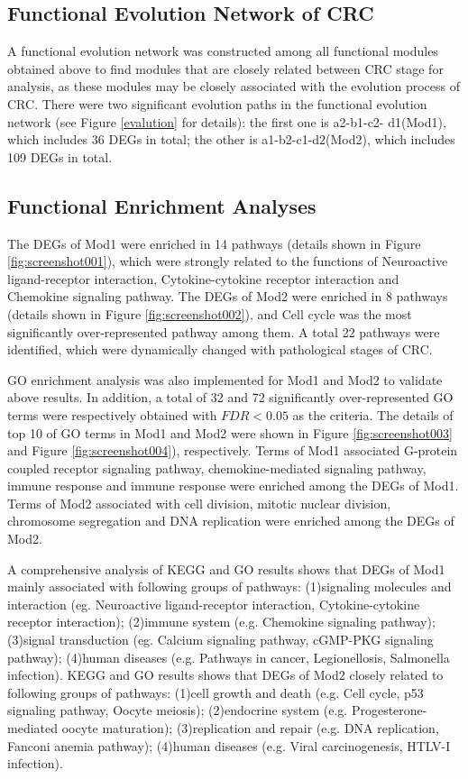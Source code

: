 \documentclass[utf8]{frontiersSCNS} %
\begin{document}
\subsection{Functional Evolution Network of CRC}

A functional evolution network was constructed among all functional modules obtained above to find modules that are closely related between CRC stage for analysis, as these modules may be closely associated with the evolution process of CRC. There were two significant evolution paths in the functional evolution
network (see Figure \ref{evalution} for details): the first one is a2-b1-c2-
d1(Mod1), which includes 36 DEGs in total; the other is
a1-b2-c1-d2(Mod2), which includes 109 DEGs in total. 

\subsection{Functional Enrichment Analyses}
The DEGs of Mod1 were enriched in 14 pathways
(details shown in Figure \ref{fig:screenshot001}), which were strongly related to
the functions of Neuroactive ligand-receptor interaction, Cytokine-cytokine receptor interaction and 
Chemokine signaling pathway. The DEGs of Mod2
were enriched in 8 pathways (details shown in Figure \ref{fig:screenshot002}), and Cell cycle was the most significantly over-represented pathway among them. A total 22
pathways were identified, which were dynamically changed
with pathological stages of CRC.

GO enrichment analysis was also implemented for Mod1 and Mod2 to validate above results. In addition, a total of 32 and 72 significantly over-represented GO terms were respectively obtained with $FDR < 0.05$ as the criteria. The details of top 10 of GO terms in Mod1 and Mod2 were shown in Figure \ref{fig:screenshot003} and Figure \ref{fig:screenshot004}), respectively. Terms of Mod1 associated 
G-protein coupled receptor signaling pathway, chemokine-mediated signaling pathway, immune response and immune response were enriched among the DEGs of Mod1. Terms of Mod2 associated with cell division, mitotic nuclear division, chromosome segregation and DNA replication were enriched among the DEGs of Mod2.


A comprehensive analysis of KEGG and GO results shows that DEGs of Mod1 mainly associated with following groups of pathways: (1)signaling molecules and interaction (eg. Neuroactive ligand-receptor interaction, Cytokine-cytokine receptor interaction); (2)immune system (e.g. Chemokine signaling pathway); (3)signal transduction (eg. Calcium signaling pathway, cGMP-PKG signaling pathway); (4)human diseases (e.g. Pathways in cancer, Legionellosis, Salmonella infection). KEGG and GO results shows that DEGs of Mod2 closely related to following groups of pathways: (1)cell growth and death (e.g. Cell cycle, p53 signaling pathway, Oocyte meiosis); (2)endocrine system (e.g. Progesterone-mediated oocyte maturation); (3)replication and repair (e.g. DNA replication, Fanconi anemia pathway); (4)human diseases (e.g. Viral carcinogenesis, HTLV-I infection).
\end{document}
